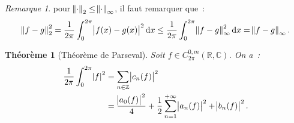 \documentclass{report}
\newtheorem{thm}{Théorème}[chapter]
\theoremstyle{definition}
\theoremstyle{remark}
\newtheorem*{rmq}{Remarque}
\numberwithin{equation}{section}
\newcommand{\C}{\mathbb C}
\newcommand{\R}{\mathbb R}
\newcommand{\Z}{\mathbb Z}
\newcommand{\pinfty}{{+\infty}}
\newcommand{\CmT}[2]{C^{#1,m}_{#2}}
\newcommand{\CzmT}[1]{\CmT 0{#1}}
\newcommand{\Czm}{\CzmT{2\pi}}
\begin{document}
			\begin{rmq} pour $\norm \cdot_2 \leq \norm \cdot_\infty$, il faut remarquer que~:
			\begin{equation}
				\norm {f-g}_2^2 = \frac 1{2\pi}\int_0^{2\pi}\abs {f(x)-g(x)}^2\dif x \leq \frac 1{2\pi}\int_0^{2\pi}\norm {f-g}_\infty^2\dif x = \norm {f-g}_\infty.
			\end{equation}
			\end{rmq}

			\begin{thm}[Théorème de Parseval]\label{thm:Parseval} Soit $f \in \Czm(\R, \C)$. On a~:
			\begin{align}
				\frac 1{2\pi}\int_0^{2\pi}\abs f^2 &= \sum_{n \in \Z}\abs {c_n(f)}^2\label{eq:Parseval exp} \\
				&= \frac {\abs {a_0(f)}^2}4 + \frac 12\sum_{n=1}^\pinfty\abs {a_n(f)}^2 + \abs {b_n(f)}^2.
			\end{align}
			\end{thm}
\end{document}
